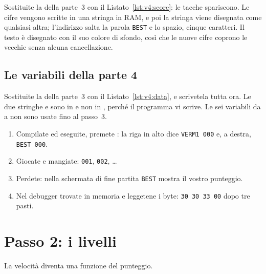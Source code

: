 
Sostituite la  della parte~3 con il
Listato~\ref{lst:v4:score}: le tacche spariscono. Le cifre vengono scritte in
una stringa in RAM, e poi la stringa viene disegnata come qualsiasi altra;
l'indirizzo  salta la parola \texttt{BEST} e lo spazio,
cinque caratteri. Il testo è disegnato con il suo colore di sfondo, così che
le nuove cifre coprono le vecchie senza alcuna cancellazione.

\subsection{Le variabili della parte 4}


Sostituite la  della parte~3 con il Listato~\ref{lst:v4:data}, e
scrivetela tutta ora. Le due stringhe  e 
sono in  e non in , perché il programma vi scrive.
Le sei variabili da  a  non sono usate fino al
passo~3.

\begin{prgcheck}
\begin{enumerate}[nosep]
\item Compilate ed eseguite, premete : la riga in alto dice
  \texttt{VERM1 000} e, a destra, \texttt{BEST 000}.
\item Giocate e mangiate: \texttt{001}, \texttt{002}, \ldots
\item Perdete: nella schermata di fine partita \texttt{BEST} mostra il vostro
  punteggio.
\item Nel debugger trovate  in memoria e leggetene i byte:
  \texttt{30 30 33 00} dopo tre pasti.
\end{enumerate}
\end{prgcheck}

\section{Passo 2: i livelli}

La velocità diventa una funzione del punteggio.


